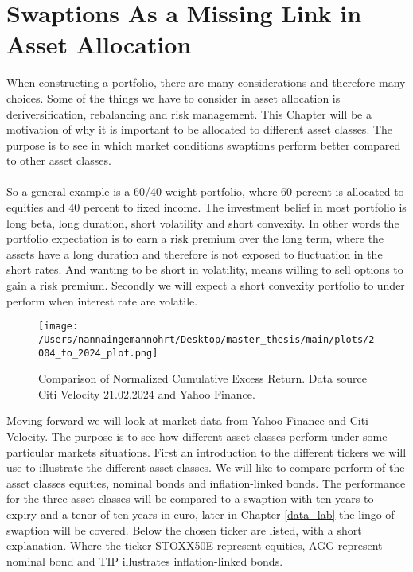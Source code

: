 \section{Swaptions As a Missing Link in Asset Allocation}
When constructing a portfolio, there are many considerations and therefore many choices. 
Some of the things we have to consider in asset allocation is deriversification, rebalancing 
and risk management. This Chapter will be a motivation of why it is important to be 
allocated to different asset classes. The purpose is to see in which market conditions
swaptions perform better compared to other asset classes.
\\\\
So a general  example is a 60/40 weight portfolio, where 60 percent is allocated to equities 
and 40 percent to fixed income. 
The investment belief in most portfolio is long beta, long duration, short volatility and short 
convexity. In other words the portfolio expectation is to earn a risk premium over the long term, 
where the assets have a long duration and therefore is not exposed to fluctuation in the short rates. 
And wanting to be short in volatility, means willing to sell options to gain a risk premium. Secondly we will expect 
a short convexity portfolio to under perform when interest rate are volatile. 
\begin{figure}[H]
    \centering
    \texttt{[image: /Users/nannaingemannohrt/Desktop/master\_thesis/main/plots/2004\_to\_2024\_plot.png]}
    \caption{Comparison of Normalized Cumulative Excess Return. Data source Citi Velocity 21.02.2024 
    and Yahoo Finance.}
    \label{fig:2004_2024}
\end{figure}
\noindent
Moving forward we will look at market data from Yahoo Finance and Citi Velocity. 
The purpose is to see how different asset classes perform under some particular markets situations.
First an introduction to the different tickers we will use to illustrate the different asset classes. 
We will like to compare perform of the asset classes equities, nominal bonds and inflation-linked bonds. 
The performance for the three asset classes will be compared to a swaption with ten years to expiry and a tenor
of ten years in euro, later in Chapter \ref{data_lab} the lingo of swaption will be covered. 
Below the chosen ticker are listed, with a short explanation. Where the ticker STOXX50E represent equities, 
AGG represent nominal bond and TIP illustrates inflation-linked bonds.

